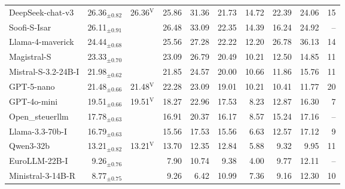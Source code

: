 \begin{tabular}{l @{\hspace{1em}} r r @{\hspace{0.5em}} r r r @{\hspace{0.5em}} r @{\hspace{1em}} r r @{\hspace{1em}} r}
DeepSeek-chat-v3 & 26.36$_{\pm0.82}$ & \cellcolor[HTML]{F7F7F7}26.36$^{\mathrm{V}}$ & \cellcolor[HTML]{F7F7F7}25.86 & \cellcolor[HTML]{B1D5E7}31.36 & \cellcolor[HTML]{FCD4BE}21.73 & 14.72 & 22.39 & 24.06 & 15 \\
Soofi-S-Isar & 26.11$_{\pm0.91}$ &  & \cellcolor[HTML]{F7F7F7}26.48 & \cellcolor[HTML]{9ECBE1}33.09 & \cellcolor[HTML]{FCD4BE}22.35 & 14.39 & 16.24 & 24.92 & -- \\
Llama-4-maverick & 24.44$_{\pm0.68}$ &  & \cellcolor[HTML]{F7F7F7}25.56 & \cellcolor[HTML]{E5EEF4}27.28 & \cellcolor[HTML]{FCDDCB}22.22 & 12.20 & 26.78 & 36.13 & 14 \\
Magistral-S & 23.33$_{\pm0.70}$ &  & \cellcolor[HTML]{F7F7F7}23.09 & \cellcolor[HTML]{D0E5F0}26.79 & \cellcolor[HTML]{FBE3D5}20.49 & 10.21 & 12.50 & 14.85 & 11 \\
Mistral-S-3.2-24B-I & 21.98$_{\pm0.62}$ &  & \cellcolor[HTML]{F7F7F7}21.85 & \cellcolor[HTML]{DBEAF2}24.57 & \cellcolor[HTML]{FAE9DF}20.00 & 10.66 & 11.86 & 15.76 & 11 \\
GPT-5-nano & 21.48$_{\pm0.66}$ & \cellcolor[HTML]{F7F7F7}21.48$^{\mathrm{V}}$ & \cellcolor[HTML]{F7F7F7}22.28 & \cellcolor[HTML]{EFF3F5}23.09 & \cellcolor[HTML]{FCDECC}19.01 & 10.21 & 10.41 & 11.77 & 20 \\
GPT-4o-mini & 19.51$_{\pm0.66}$ & \cellcolor[HTML]{F7F7F7}19.51$^{\mathrm{V}}$ & \cellcolor[HTML]{F7F7F7}18.27 & \cellcolor[HTML]{BFDCEB}22.96 & \cellcolor[HTML]{F8F1ED}17.53 & 8.23 & 12.87 & 16.30 & 7 \\
Open\_steuerllm & 17.78$_{\pm0.63}$ &  & \cellcolor[HTML]{F7F7F7}16.91 & \cellcolor[HTML]{D3E6F0}20.37 & \cellcolor[HTML]{F8F1ED}16.17 & 8.57 & 15.24 & 17.16 & -- \\
Llama-3.3-70b-I & 16.79$_{\pm0.63}$ &  & \cellcolor[HTML]{F7F7F7}15.56 & \cellcolor[HTML]{E2EDF3}17.53 & \cellcolor[HTML]{F7F7F7}15.56 & 6.63 & 12.57 & 17.12 & 9 \\
Qwen3-32b & 13.21$_{\pm0.82}$ & \cellcolor[HTML]{F7F7F7}13.21$^{\mathrm{V}}$ & \cellcolor[HTML]{EEF3F5}13.70 & \cellcolor[HTML]{F8F3F1}12.35 & \cellcolor[HTML]{F7F7F7}12.84 & 5.88 & 9.32 & 9.95 & 11 \\
EuroLLM-22B-I & 9.26$_{\pm0.76}$ &  & \cellcolor[HTML]{F9ECE4}7.90 & \cellcolor[HTML]{E9F0F4}10.74 & \cellcolor[HTML]{F7F7F7}9.38 & 4.00 & 9.77 & 12.11 & -- \\
Ministral-3-14B-R & 8.77$_{\pm0.75}$ &  & \cellcolor[HTML]{F7F7F7}9.26 & \cellcolor[HTML]{FCE1D2}6.42 & \cellcolor[HTML]{E5EEF4}10.99 & 7.36 & 9.16 & 12.30 & 10 \\

\end{tabular}
